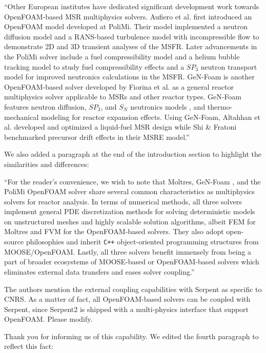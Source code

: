 \documentclass[answers,11pt]{exam}
\begin{document}
\begin{questions}
\begin{solution}
        	``Other European institutes have dedicated significant development work towards
OpenFOAM-based MSR multiphysics solvers. Aufiero et al.
\cite{aufiero_development_2014} first introduced an OpenFOAM model developed
at PoliMi. Their model implemented a neutron diffusion model and a
RANS-based turbulence model with incompressible flow to demonstrate 2D
and 3D transient analyses of the MSFR. Later advancements in the
PoliMi solver include a fuel compressibility model and a helium bubble
tracking model to study fuel compressibility effects
\cite{cervi_development_2019} and a $SP_3$ neutron transport
model for improved neutronics calculations \cite{cervi_development_2019-1} in
the MSFR. GeN-Foam is another OpenFOAM-based solver developed by Fiorina
et al. \cite{fiorina_gen-foam_2015} as a general reactor multiphysics solver
applicable to MSRs and other reactor types. GeN-Foam features neutron
diffusion, $SP_3$, and $S_N$ neutronics models 
\cite{fiorina_development_2016,fiorina_gen-foam_2015,fiorina_detailed_2019},
and thermo-mechanical modeling for reactor expansion effects. Using GeN-Foam,
Altahhan et al. \cite{altahhan_preliminary_2020} developed and optimized a
liquid-fuel MSR design while Shi \& Fratoni \cite{shi_gen-foam_2021}
benchmarked precursor drift effects in their MSRE model.''
            
            We also added a paragraph at the end of the introduction section to
            highlight the similarities and differences:
            
            ``For the reader's convenience, we wish to note that Moltres, GeN-Foam
\cite{fiorina_gen-foam_2015}, and the PoliMi OpenFOAM solver
\cite{aufiero_development_2014} share several common characteristics as
multiphysics solvers for reactor analysis. In terms of numerical methods, all
three solvers implement general PDE discretization methods for solving
deterministic models on unstructured meshes and highly scalable solution
algorithms, albeit FEM for Moltres and FVM for the OpenFOAM-based
solvers. They also adopt open-source philosophies and inherit \texttt{C++}
object-oriented programming structures from MOOSE/OpenFOAM. Lastly, all
three solvers benefit immensely from being a part of broader ecosystems of
MOOSE-based or OpenFOAM-based solvers which eliminates external data
transfers and eases solver coupling.''
        \end{solution}

        \question The authors mention the external coupling capabilities with
        Serpent as specific to CNRS. As a matter of fact, all OpenFOAM-based
        solvers can be coupled with Serpent, since Serpent2 is shipped with a
        multi-physics interface that support OpenFOAM. Please modify.
        \begin{solution}
        	Thank you for informing us of this capability. We edited the fourth
        	paragraph to reflect this fact:
        	

\end{solution}
\end{questions}
\end{document}
